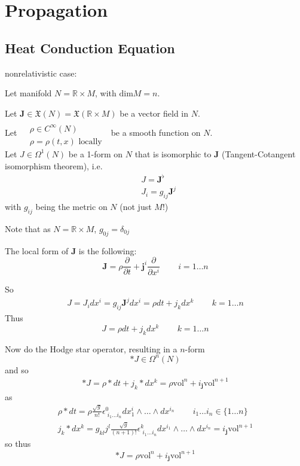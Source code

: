 \documentclass[twoside]{amsart}
\theoremstyle{plain}
\theoremstyle{definition}
\begin{document}
\section{Propagation}

\subsection*{Heat Conduction Equation}

nonrelativistic case: 

Let manifold $N = \mathbb{R} \times M$, with $\text{dim}M = n$.  

Let $\mathbf{J} \in \mathfrak{X}(N) = \mathfrak{X}(\mathbb{R}\times M)$ be a vector field in $N$.  \\
Let $\begin{aligned} & \quad \\ 
  & \rho \in C^{\infty}(N) \\ 
  & \rho = \rho(t,x) \text{ locally } \end{aligned}$ be a smooth function on $N$.  \\
Let $J \in \Omega^1(N)$ be a 1-form on $N$ that is isomorphic to $\mathbf{J}$ (Tangent-Cotangent isomorphism theorem), i.e.
\[
\begin{aligned}
& J = \mathbf{J}^{\flat}  \\
& J_i = g_{ij} \mathbf{J}^j
\end{aligned}
\]
with $g_{ij}$ being the metric on $N$ (not just $M$!)

Note that as $N = \mathbb{R}\times M$, $g_{0j} = \delta_{0j}$

The local form of $\mathbf{J}$ is the following:
\[
\mathbf{J} = \rho \frac{ \partial }{ \partial t} + \mathbf{j}^i \frac{ \partial }{ \partial x^i} \quad \quad \, i=1\dots n
\]

So 
\[
\begin{gathered}
  J = J_i dx^i = g_{ij} \mathbf{J}^j dx^i = \rho dt + j_k dx^k \quad \quad \, k = 1 \dots n 
\end{gathered}
\]
Thus
\begin{equation}
  J = \rho dt + j_k dx^k \quad \quad \, k=1\dots n
\end{equation}

Now do the Hodge star operator, resulting in a $n$-form
\[
*J \in \Omega^n(N)
\]
and so
\[
\begin{gathered}
  *J = \rho * dt + j_k * dx^k = \rho \text{vol}^n + i_{\mathbf{j}}\text{vol}^{n+1}
\end{gathered}
\]
as
\[
\begin{gathered}
  \rho * dt = \rho \frac{ \sqrt{g}}{ n !} \epsilon^0_{ \, \, i_1 \dots i_n} dx^i_1 \wedge \dots \wedge dx^{i_n} \quad \quad \, i_1 \dots i_n \in \lbrace 1 \dots n \rbrace \\ 
  j_k * dx^k = g_{kl} j^l \frac{ \sqrt{g}}{ (n+1)!} \epsilon^k_{ \, \, i_1 \dots i_n} dx^{i_1} \wedge \dots \wedge dx^{i_n} = i_{\mathbf{j}} \text{vol}^{n+1} 
\end{gathered}
\]
so thus
\[
*J = \rho \text{vol}^n + i_{\mathbf{j}} \text{vol}^{n+1}
\]
\end{document}
